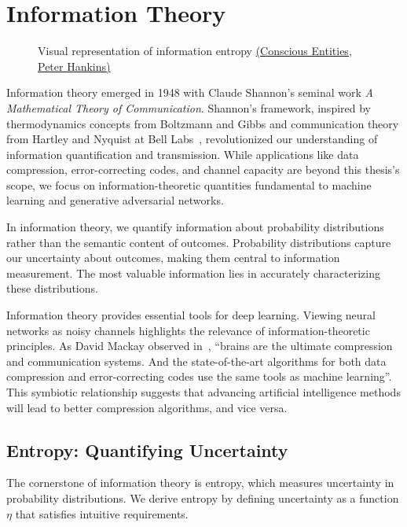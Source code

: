 \section{Information Theory}%
\label{sec:information-theory}
\vspace{0.5cm}
\begin{figure}[h!]%
	\label{fig:info}
	\centering
	\caption{Visual representation of information entropy \href{https://www.consciousentities.com/2017/02/consciousness-entropy/}{(Conscious Entities, Peter Hankins)}}
\end{figure}
\vspace{0.5cm}

Information theory emerged in 1948 with Claude Shannon's seminal work \textit{A Mathematical Theory of Communication}. Shannon's framework, inspired by thermodynamics concepts from Boltzmann and Gibbs and communication theory from Hartley and Nyquist at Bell Labs~\cite{ref:losee-1997}, revolutionized our understanding of information quantification and transmission. While applications like data compression, error-correcting codes, and channel capacity are beyond this thesis's scope, we focus on information-theoretic quantities fundamental to machine learning and generative adversarial networks.

\begin{remark}
	In information theory, we quantify information about probability distributions rather than the semantic content of outcomes. Probability distributions capture our uncertainty about outcomes, making them central to information measurement. The most valuable information lies in accurately characterizing these distributions.
\end{remark}

Information theory provides essential tools for deep learning. Viewing neural networks as noisy channels highlights the relevance of information-theoretic principles. As David Mackay observed in~\cite{ref:mackay-2003}, ``brains are the ultimate compression and communication systems. And the state-of-the-art algorithms for both data compression and error-correcting codes use the same tools as machine learning''. This symbiotic relationship suggests that advancing artificial intelligence methods will lead to better compression algorithms, and vice versa.

\subsection{Entropy: Quantifying Uncertainty}
The cornerstone of information theory is entropy, which measures uncertainty in probability distributions. We derive entropy by defining uncertainty as a function $\eta$ that satisfies intuitive requirements.


